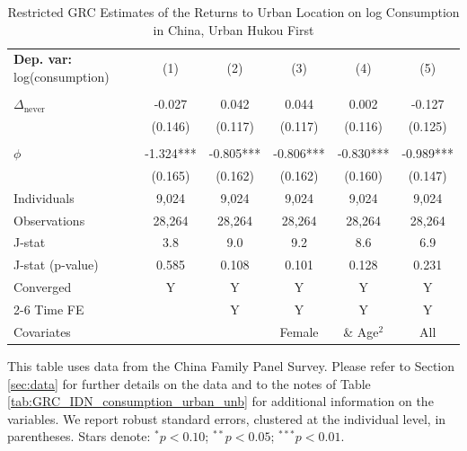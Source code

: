 \begin{table}[htbp] \centering \begin{threeparttable}
 \caption{Restricted GRC Estimates of the Returns to Urban Location on log Consumption in China, Urban Hukou First} 
 \label{tab:GRC_CHN_urban_first_consumption_urban_unb} 
\begin{tabular}{l ccccc} \toprule  \textbf{Dep. var:}  log(consumption) 
                    &\multicolumn{1}{c}{(1)}   &\multicolumn{1}{c}{(2)}   &\multicolumn{1}{c}{(3)}   &\multicolumn{1}{c}{(4)}   &\multicolumn{1}{c}{(5)}   \\
                    &               &               &               &               &               \\
\addlinespace
$\Delta_{\text{never}}$&      -0.027   &       0.042   &       0.044   &       0.002   &      -0.127   \\
                    &     (0.146)   &     (0.117)   &     (0.117)   &     (0.116)   &     (0.125)   \\
                    &               &               &               &               &               \\
\addlinespace
$\phi$              &      -1.324***&      -0.805***&      -0.806***&      -0.830***&      -0.989***\\
                    &     (0.165)   &     (0.162)   &     (0.162)   &     (0.160)   &     (0.147)   \\
\addlinespace
Individuals         &       9,024   &       9,024   &       9,024   &       9,024   &       9,024   \\
Observations        &      28,264   &      28,264   &      28,264   &      28,264   &      28,264   \\
J-stat              &         3.8   &         9.0   &         9.2   &         8.6   &         6.9   \\
J-stat (p-value)    &       0.585   &       0.108   &       0.101   &       0.128   &       0.231   \\
Converged           &           Y   &           Y   &           Y   &           Y   &           Y   \\
\cmidrule{2-6} Time FE & & Y & Y & Y & Y \\ Covariates & & & Female & \& Age$^2$ & All \\ \bottomrule \end{tabular} \begin{tablenotes}[flushleft] \footnotesize \item{This table uses data from the China Family Panel Survey. Please refer to Section \ref{sec:data} for further details on the data and to the notes of Table \ref{tab:GRC_IDN_consumption_urban_unb} for additional information on the variables. We report robust standard errors, clustered at the individual level, in parentheses. Stars denote: $^{*} p<0.10$; $^{**} p<0.05$; $^{***} p<0.01$.} \end{tablenotes} \end{threeparttable} \end{table}
